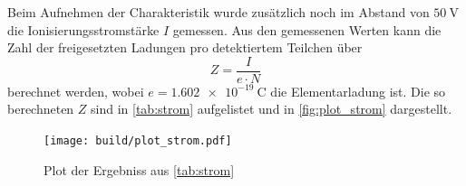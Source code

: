 Beim Aufnehmen der Charakteristik wurde zusätzlich noch im Abstand von $\SI{50}{\volt}$ die Ionisierungsstromstärke $I$ gemessen.
Aus den gemessenen Werten kann die Zahl der freigesetzten Ladungen pro detektiertem Teilchen über
\begin{equation}
    Z = \frac{I}{e \cdot N}
\end{equation}
berechnet werden, wobei $e=\SI{1.602e-19}{\coulomb}$ die Elementarladung ist.
Die so berechneten $Z$ sind in \autoref{tab:strom} aufgelistet und in \autoref{fig:plot_strom} dargestellt.

\begin{figure}
    \centering
    \texttt{[image: build/plot\_strom.pdf]}
    \caption{Plot der Ergebniss aus \autoref{tab:strom}}
    \label{fig:plot_strom}
\end{figure}
